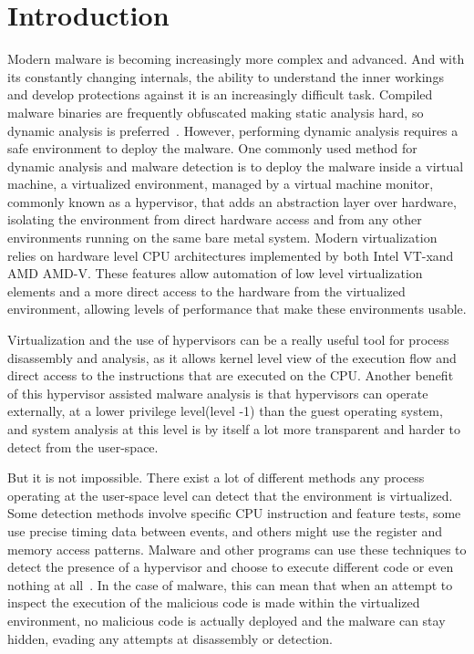 \section{Introduction}\label{s:intro}

Modern malware is becoming increasingly more complex and advanced.
And with its constantly changing internals, the ability to understand the inner workings and develop protections against it is an increasingly difficult task. 
Compiled malware binaries are frequently obfuscated making static analysis hard, so dynamic analysis is preferred~\cite{Leon2021, 10.1145/2245276.2232070}. However, performing dynamic analysis requires a safe environment 
to deploy the malware. One commonly used method for dynamic analysis and malware detection is to deploy the malware inside a virtual machine, a virtualized environment, managed by a virtual machine monitor, 
commonly known as a hypervisor, that adds an abstraction layer over hardware, isolating the environment from direct hardware access and from any other environments running on the same bare metal system. 
Modern virtualization relies on hardware level CPU architectures implemented by both Intel\textsuperscript{\tiny\textregistered} VT-x\texttrademark and AMD\textsuperscript{\tiny\textregistered} AMD-V\texttrademark. 
These features allow automation of low level virtualization elements and a more direct access to the hardware from the virtualized environment, allowing levels of performance that make these environments usable.

Virtualization and the use of hypervisors can be a really useful tool for process disassembly and analysis, as it allows kernel level view of the execution flow and direct access to the instructions that are executed on the CPU.
Another benefit of this hypervisor assisted malware analysis is that hypervisors can operate externally, at a lower privilege level(level -1) than the guest operating system, 
and system analysis at this level is by itself a lot more transparent and harder to detect from the user-space.

But it is not impossible. There exist a lot of different methods any process operating at the user-space level can detect that the environment is virtualized. 
Some detection methods involve specific CPU instruction and feature tests, some use precise timing data between events, and others might use the register and memory access patterns. 
Malware and other programs can use these techniques to detect the presence of a hypervisor and choose to execute different code or even nothing at all~\cite{10.1109/TIFS.2020.2976559}. 
In the case of malware, this can mean that when an attempt to inspect the execution of the malicious code is made within the virtualized environment, 
no malicious code is actually deployed and the malware can stay hidden, evading any attempts at disassembly or detection.

